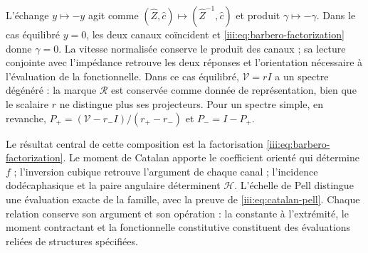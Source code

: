 L’échange $y\mapsto-y$ agit comme
$(\widehat Z,\widehat c)\mapsto(\widehat Z^{-1},\widehat c)$ et
produit $\gamma\mapsto-\gamma$. Dans le cas équilibré $y=0$,
les deux canaux coïncident et \eqref{iii:eq:barbero-factorization} donne
$\gamma=0$. La vitesse normalisée conserve le produit des
canaux ; sa lecture conjointe avec l’impédance retrouve les deux
réponses et l’orientation nécessaire à l’évaluation de la fonctionnelle.
Dans ce cas équilibré, $\mathcal V=rI$ a un spectre dégénéré :
la marque $\mathcal R$ est conservée comme donnée de représentation, bien que
le scalaire $r$ ne distingue plus ses projecteurs. Pour un spectre simple,
en revanche,
$P_+=(\mathcal V-r_-I)/(r_+-r_-)$ et $P_-=I-P_+$.

Le résultat central de cette composition est la factorisation
\eqref{iii:eq:barbero-factorization}. Le moment de Catalan apporte le
coefficient orienté qui détermine $f$ ; l’inversion cubique retrouve
l’argument de chaque canal ; l’incidence dodécaphasique et la paire angulaire
déterminent $\mathcal H$. L’échelle de Pell distingue une évaluation
exacte de la famille, avec la preuve de
\eqref{iii:eq:catalan-pell}. Chaque relation conserve son argument et son
opération : la constante à l’extrémité, le moment contractant et la fonctionnelle
constitutive constituent des évaluations reliées de structures
spécifiées.
